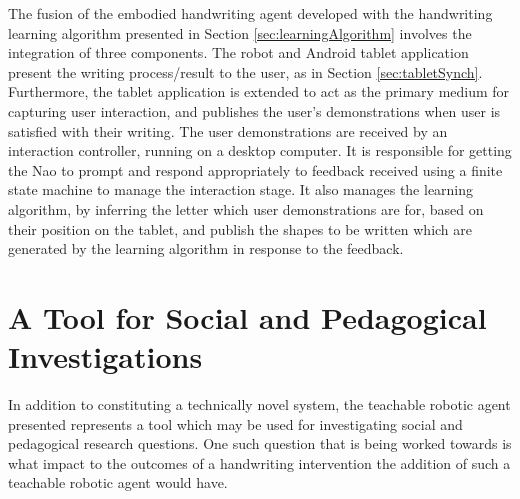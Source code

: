 \documentclass{sig-alternate}
\begin{document}
The fusion of the embodied handwriting agent developed with the handwriting
learning algorithm presented in Section \ref{sec:learningAlgorithm} involves the
integration of three components. The robot and Android tablet application
present the writing process/result to the user, as in Section
\ref{sec:tabletSynch}. Furthermore, the tablet application is extended to act as
the primary medium for capturing user interaction, and publishes the user's
demonstrations when user is satisfied with their writing. The user
demonstrations are received by an interaction controller, running on a desktop
computer. It is responsible for getting the Nao to prompt and respond
appropriately to feedback received using a finite state machine to manage the
interaction stage. It also manages the learning algorithm, by inferring the
letter which user demonstrations are for, based on their position on the tablet,
and publish the shapes to be written which are generated by the learning
algorithm in response to the feedback.  





\section{A Tool for Social and Pedagogical Investigations} \label{sec:experiment}
\label{sec4}

In addition to constituting a technically novel system, the teachable robotic
agent presented represents a tool which may be used for investigating social and
pedagogical research questions. One such question that is being worked towards
is what impact to the outcomes of a handwriting intervention the addition of
such a teachable robotic agent would have. 

\end{document}
